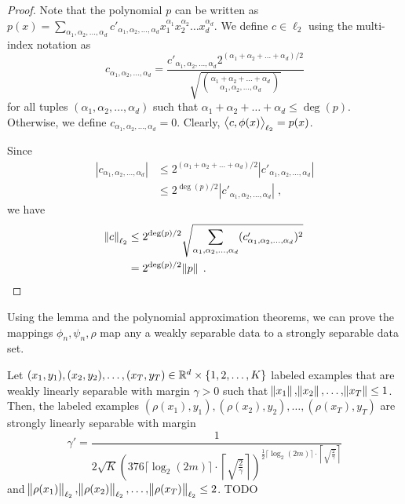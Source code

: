 \begin{proof}
Note that the polynomial $p$ can be written as
$p(x) = \sum_{\alpha_1, \alpha_2, \dots, \alpha_d} c'_{\alpha_1, \alpha_2, \dots, \alpha_d} x_1^{\alpha_1} x_2^{\alpha_2} \dots x_d^{\alpha_d}$.
We define $c \in \ell_2$ using the multi-index notation as
$$
c_{\alpha_1, \alpha_2, \dots, \alpha_d}
= \frac{c'_{\alpha_1, \alpha_2, \dots, \alpha_d} 2^{(\alpha_1 + \alpha_2 + \dots + \alpha_d)/2}}{\sqrt{\binom{\alpha_1 + \alpha_2 + \dots + \alpha_d}{\alpha_1, \alpha_2, \dots, \alpha_d}}}
$$
for all tuples $(\alpha_1, \alpha_2, \dots, \alpha_d)$ such that $\alpha_1 + \alpha_2 + \dots + \alpha_d \le \deg(p)$.
Otherwise, we define $c_{\alpha_1, \alpha_2, \dots, \alpha_d} = 0$. Clearly,
$\left\langle c, \phi(x) \right\rangle_{\ell_2} = p(x)$.

Since
\begin{align*}
|c_{\alpha_1, \alpha_2, \dots, \alpha_d}|
& \le 2^{(\alpha_1 + \alpha_2 + \dots + \alpha_d)/2} |c'_{\alpha_1, \alpha_2, \dots, \alpha_d}| \\
& \le 2^{\deg(p)/2} |c'_{\alpha_1, \alpha_2, \dots, \alpha_d}| \; ,
\end{align*}
we have
\begin{align*}
\norm{c}_{\ell_2}
& \le 2^{\deg(p)/2} \sqrt{\sum_{\alpha_1, \alpha_2, \dots, \alpha_d} (c'_{\alpha_1, \alpha_2, \dots, \alpha_d})^2} \\
& = 2^{\deg(p)/2} \norm{p} \; .
\end{align*}
\end{proof}

Using the lemma and the polynomial approximation theorems, we can prove
the mappings $\phi_n, \psi_n, \rho$ map any a weakly separable data
to a strongly separable data set.

\begin{theorem}
\label{theorem:margin-transformation}
Let $(x_1, y_1), (x_2, y_2), \dots, (x_T, y_T) \in \mathbb{R}^d \times \{1,2,\dots,K\}$
labeled examples that are weakly linearly separable with margin $\gamma > 0$
such that $\norm{x_1}, \norm{x_2}, \dots, \norm{x_T} \le 1$. Then, the labeled
examples $(\rho(x_1), y_1), (\rho(x_2), y_2), \dots, (\rho(x_T), y_T)$ are
strongly linearly separable with margin
$$
\gamma' = \frac{1}{2\sqrt{K} \left(376 \lceil \log_2(2m) \rceil \cdot \left \lceil \sqrt{\frac{2}{\gamma}} \right \rceil \right)^{\frac{1}{2} \lceil \log_2(2m) \rceil \cdot \left \lceil \sqrt{\frac{2}{\gamma}} \right \rceil}}
$$
and $\norm{\rho(x_1)}_{\ell_2}, \norm{\rho(x_2)}_{\ell_2}, \dots, \norm{\rho(x_T)}_{\ell_2} \le 2$.
TODO
\end{theorem}

